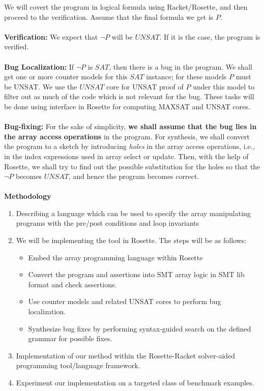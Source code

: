 \documentclass[letterpaper]{article} %
\begin{document}
We will covert the program in logical formula using Racket/Rosette, and then proceed to the verification. Assume that the final formula we get is $P$.\\\\
{\bf Verification:} We expect that $\neg P$ will be $UNSAT$. If it is the case, the program is verified.
\\\\
{\bf Bug Localization:} If $\neg P$ is $SAT$, then there is a bug in the program. We shall get one or more counter models for this $SAT$ instance; for these models $P$ must be UNSAT.  We use the $UNSAT$ core for UNSAT proof of $P$ under this model to filter out as much of the code which is not relevant for the bug. These tasks will be done using interface in Rosette for computing MAXSAT and UNSAT cores. \\
\\
{\bf Bug-fixing:} For the sake of simplicity, {\bf we shall assume that the bug lies in the array access operations} in the program. For synthesis, we shall convert the program to a sketch by introducing \emph{holes} in the array access operations, i.e., in the index expressions used in array select or update. Then, with the help of Rosette, we shall try to find out the possible substitution for the holes so that the $\neg P$ becomes $UNSAT$, and hence the program becomes correct. \\
\\
{\bf Methodology}
\begin{enumerate}
	\item  Describing a language which can be used to specify the array manipulating programs with the pre/post conditions and loop invariants
	\item We will be implementing the tool in Rosette. The steps will be as follows:
	\begin{itemize}
		\item Embed the array programming language within Rosette
		\item Convert the program and assertions into SMT array logic in SMT lib format and check assertions.
		\item Use counter models and related UNSAT cores to perform bug localization.
		\item Synthesize bug fixes by performing syntax-guided search on the defined grammar for possible fixes.
	\end{itemize}
	\item Implementation of our method within the Rosette-Racket solver-aided programming tool/language framework.
	\item Experiment our implementation on a targeted class of benchmark examples.
\end{enumerate}
\end{document}
